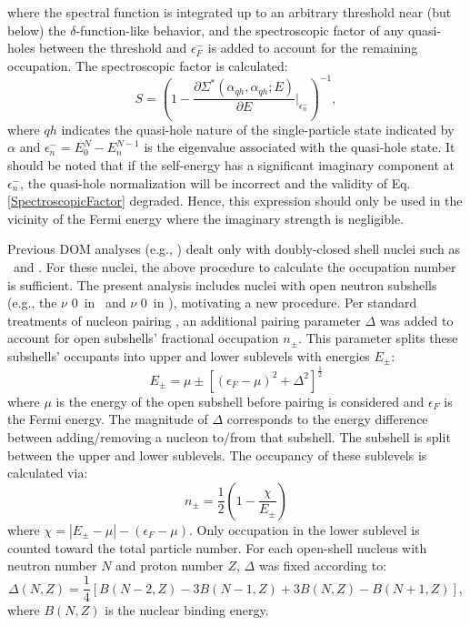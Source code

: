 where the spectral function is integrated up to an arbitrary threshold near (but below) the
$\delta$-function-like behavior, and the spectroscopic factor of any quasi-holes between the threshold and
$\epsilon_{F}^{-}$ is added to account for the remaining occupation. The spectroscopic factor is
calculated:
\begin{equation} \label{SpectroscopicFactor}
    S = \left(1-\frac{\partial\Sigma^{*}(\alpha_{qh},\alpha_{qh};E)}
    {\partial{E}}\bigg\rvert_{\epsilon_{n}^{-}}\right)^{-1},
\end{equation}
where $qh$ indicates the quasi-hole nature of the single-particle state indicated
by $\alpha$ and $\epsilon_{n}^{-} = E_{0}^{N}-E_{n}^{N-1}$ is the
eigenvalue associated with the quasi-hole state. It should be noted that if the
self-energy has a significant imaginary component at $\epsilon_{n}^{-}$, the
quasi-hole normalization will be incorrect and the validity of Eq.
\ref{SpectroscopicFactor} degraded. Hence, this expression should only be used
in the vicinity of the Fermi energy where the imaginary strength is negligible.

Previous DOM analyses (e.g., \cite{MahzoonPhDThesis}) dealt only with doubly-closed 
shell nuclei such as \caForty\ and \caEight.
For these nuclei, the above procedure to calculate the occupation number is
sufficient. The present analysis includes nuclei with open neutron subshells
(e.g., the $\nu$ 0\dFive\ in \oEight\ and $\nu$ 0\fFive\ in \niEight), motivating a new
procedure. Per standard treatments of nucleon pairing \cite{BohrAndMottelson}, an additional
pairing parameter $\Delta$ was added to account for open subshells' fractional occupation $n_{\pm}$.
This parameter splits these subshells' occupants into upper and lower sublevels with energies 
$E_{\pm}$:
\begin{equation}
    E_{\pm} = \mu \pm [(\epsilon_{F}-\mu)^{2} + \Delta^{2}]^{\frac{1}{2}}
\end{equation}
where $\mu$ is the energy of the open subshell before pairing is considered and
$\epsilon_{F}$ is the Fermi
energy. The magnitude of $\Delta$ corresponds to the energy difference between
adding/removing a nucleon to/from that subshell. The subshell
is split between the upper and lower sublevels. The occupancy of these sublevels is calculated via:
\begin{equation}
    n_{\pm} = \frac{1}{2}\left( 1-\frac{\chi}{E_{\pm}}\right)
\end{equation}
where $\chi = |E_{\pm}-\mu| - (\epsilon_{F} - \mu)$. Only occupation in the
lower sublevel is counted toward the total particle number. For each open-shell
nucleus with neutron number $N$ and proton number $Z$, $\Delta$ was fixed according to:
\begin{equation}
    \Delta(N,Z) = \frac{1}{4}\left[B(N-2,Z)-3B(N-1,Z) + 3B(N,Z)-B(N+1,Z)\right],
\end{equation}
where $B(N,Z)$ is the nuclear binding energy.


